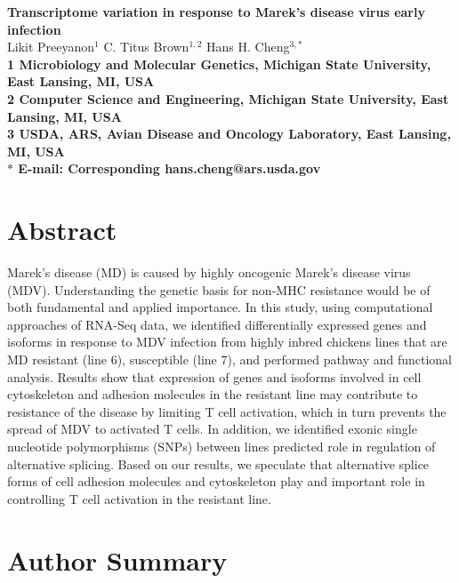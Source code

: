 \documentclass[10pt]{article}
\date{}
\begin{document}
\begin{flushleft}
{\Large
\textbf{Transcriptome variation in response to Marek's disease virus early infection}
}
\\
Likit Preeyanon$^{1}$
C. Titus Brown$^{1,2}$
Hans H. Cheng$^{3,\ast}$
\\
\bf{1} Microbiology and Molecular Genetics, Michigan State University, East Lansing, MI, USA
\\
\bf{2} Computer Science and Engineering, Michigan State University, East Lansing, MI, USA
\\
\bf{3} USDA, ARS, Avian Disease and Oncology Laboratory, East Lansing, MI, USA
\\
$\ast$ E-mail: Corresponding hans.cheng@ars.usda.gov
\end{flushleft}

\section*{Abstract}
Marek's disease (MD) is caused by highly oncogenic Marek's
disease virus (MDV).  Understanding the genetic basis for non-MHC
resistance would be of both fundamental and applied importance.
In this study, using computational approaches of RNA-Seq data, we
identified differentially expressed genes and isoforms in
response to MDV infection from highly inbred chickens lines that
are MD resistant (line 6), susceptible (line 7), and performed
pathway and functional analysis.  Results show that expression of
genes and isoforms involved in cell cytoskeleton and adhesion
molecules in the resistant line may contribute to resistance of
the disease by limiting T cell activation, which in turn prevents
the spread of MDV to activated T cells.  In addition, we
identified exonic single nucleotide polymorphisms (SNPs) between
lines predicted role in regulation of alternative splicing.
Based on our results, we speculate that alternative splice forms
of cell adhesion molecules and cytoskeleton play and important
role in controlling T cell activation in the resistant line.

\section*{Author Summary}
\end{document}
